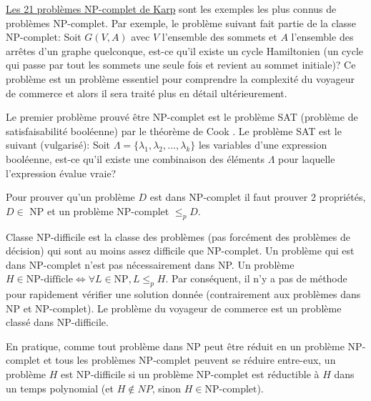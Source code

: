 \documentclass[../main.tex]{subfiles}
\begin{document}
\href{https://fr.wikipedia.org/wiki/21_probl\%C3\%A8mes_NP-complets_de_Karp}{Les 21 problèmes NP-complet de Karp} \cite{Karp1972} sont les exemples les plus connus de problèmes NP-complet. Par exemple, le problème suivant fait partie de la classe NP-complet: Soit $G(V, A)$ avec $V$ l'ensemble des sommets et $A$ l'ensemble des arrêtes d'un graphe quelconque, est-ce qu'il existe un cycle Hamiltonien (un cycle qui passe par tout les sommets une seule fois et revient au sommet initiale)? Ce problème est un problème essentiel pour comprendre la complexité du voyageur de commerce et alors il sera traité plus en détail ultérieurement.

Le premier problème prouvé être NP-complet est le problème SAT (problème de satisfaisabilité booléenne) par le théorème de Cook \cite{Cook1971}. Le problème SAT est le suivant (vulgarisé): Soit $\Lambda = \{\lambda _1, \lambda _2, \dots, \lambda_k\}$ les variables d'une expression booléenne, est-ce qu'il existe une combinaison des éléments $\Lambda$ pour laquelle l'expression évalue vraie?

Pour prouver qu'un problème $D$ est dans NP-complet il faut prouver 2 propriétés, $D \in$ NP et un problème NP-complet $\leq _p D$.

\begin{definition}
Classe NP-difficile est la classe des problèmes (pas forcément des problèmes de décision) qui sont au moins assez difficile que NP-complet. Un problème qui est dans NP-complet n'est pas nécessairement dans NP. Un problème $H \in \text{NP-difficle} \iff \forall L \in \text{NP}, L \leq _p H$. Par conséquent, il n'y a pas de méthode pour rapidement vérifier une solution donnée (contrairement aux problèmes dans NP et NP-complet). Le problème du voyageur de commerce est un problème classé dans NP-difficile.
\end{definition}

En pratique, comme tout problème dans NP peut être réduit en un problème NP-complet et tous les problèmes NP-complet peuvent se réduire entre-eux, un problème $H$ est NP-difficile si un problème NP-complet est réductible à $H$ dans un temps polynomial (et $H \notin NP$, sinon $H \in \text{NP-complet}$).
\end{document}
